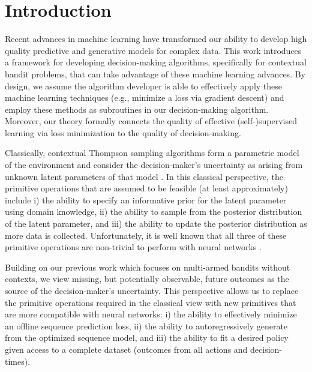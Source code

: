 \section{Introduction}
Recent advances in machine learning have transformed our ability to develop high quality predictive and generative models for complex data. This work introduces a framework for developing decision-making algorithms, specifically for contextual bandit problems, that can take advantage of these machine learning advances. By design, we assume the algorithm developer is able to effectively apply these machine learning techniques (e.g., minimize a loss via gradient descent) and employ these methods as subroutines in our decision-making algorithm. Moreover, our theory formally connects the quality of effective (self-)supervised learning via loss minimization to the quality of decision-making.

Classically, contextual Thompson sampling algorithms form a parametric model of the environment and consider the decision-maker's uncertainty as arising from unknown latent parameters of that model \citep{russo2020tutorial}. In this classical perspective, the primitive operations that are assumed to be feasible (at least approximately) include i) the ability to specify an informative prior for the latent parameter using domain knowledge, ii) the ability to sample from the posterior distribution of the latent parameter, and iii) the ability to update the posterior distribution as more data is collected. 
Unfortunately, it is well known that all three of these primitive operations are non-trivial to perform with neural networks \citep{tran2020practical,goan2020bayesian}.

Building on our previous work \citep{psar2024} which focuses on multi-armed bandits without contexts, we view missing, but potentially observable, future outcomes as the source of the decision-maker's uncertainty. This perspective allows us to replace the primitive operations required in the classical view with new primitives that are more compatible with neural networks: i) the ability to effectively minimize an offline sequence prediction loss, ii) the ability to autoregressively generate from the optimized sequence model, and iii) the ability to fit a desired policy given access to a complete dataset (outcomes from all actions and decision-times). 


